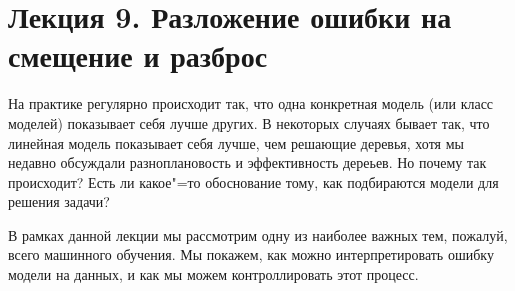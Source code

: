 \section*{Лекция 9. Разложение ошибки на смещение и разброс}

На практике регулярно происходит так, что одна конкретная модель (или класс моделей) показывает себя лучше других. В некоторых случаях бывает так, что линейная модель показывает себя лучше, чем решающие деревья, хотя мы недавно обсуждали разноплановость и эффективность дереьев. Но почему так происходит? Есть ли какое"=то обоснование тому, как подбираются модели для решения задачи?

В рамках данной лекции мы рассмотрим одну из наиболее важных тем, пожалуй, всего машинного обучения. Мы покажем, как можно интерпретировать ошибку модели на данных, и как мы можем контроллировать этот процесс.